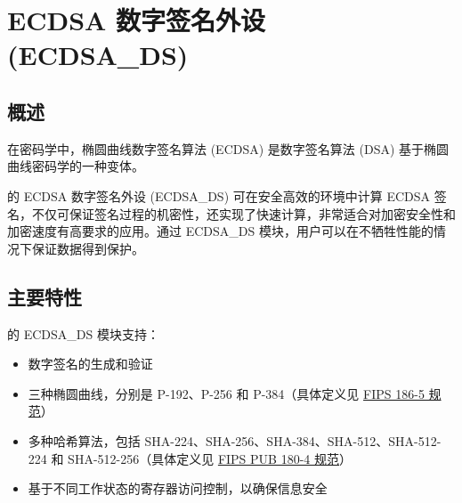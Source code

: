 \documentclass[main\_\_CN.tex]{subfiles}
\begin{document}

\ifglobal
\else
    \listoftodos
    {\let\clearpage\relax \listofdonetodos}
    \tableofcontents
\fi



\hypertarget{ecdsa}{}
\chapter{ECDSA 数字签名外设 (ECDSA\_DS)}
\label{mod:ecdsa}



\section{概述}

在密码学中，椭圆曲线数字签名算法 (ECDSA) 是数字签名算法 (DSA) 基于椭圆曲线密码学的一种变体。

\chipname{} 的 ECDSA 数字签名外设 (ECDSA\_DS) 可在安全高效的环境中计算 ECDSA 签名，不仅可保证签名过程的机密性，还实现了快速计算，非常适合对加密安全性和加密速度有高要求的应用。通过 ECDSA\_DS 模块，用户可以在不牺牲性能的情况下保证数据得到保护。



\section{主要特性}
\label{sec:ecdsa-features}

\chipname{} 的 ECDSA\_DS 模块支持：

\begin{itemize}
    \item 数字签名的生成和验证
    \item 三种椭圆曲线，分别是 P-192、P-256 和 P-384（具体定义见 \href{https://nvlpubs.nist.gov/nistpubs/FIPS/NIST.FIPS.186-5.pdf}{FIPS 186-5 规范}）
    \item 多种哈希算法，包括 SHA-224、SHA-256、SHA-384、SHA-512、SHA-512-224 和 SHA-512-256（具体定义见 \href{https://doi.org/10.6028/NIST.FIPS.180-4}{FIPS PUB 180-4 规范}）
    \item 基于不同工作状态的寄存器访问控制，以确保信息安全
\end{itemize}
\end{document}

